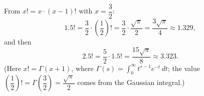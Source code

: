 From $x!=x\cdot(x-1)!$ with $x=\dfrac{3}{2}$:
\[
1.5!=\dfrac{3}{2}\cdot\left(\dfrac{1}{2}\right)!=\dfrac{3}{2}\cdot\dfrac{\sqrt\pi}{2}=\boxed{\dfrac{3\sqrt\pi}{4}}\approx1.329,
\]
and then
\[
2.5!=\dfrac{5}{2}\cdot1.5!=\boxed{\dfrac{15\sqrt\pi}{8}}\approx3.323 .
\]
(Here $x!=\Gamma(x+1)$, where $\Gamma(s)=\displaystyle\int_0^\infty t^{s-1}e^{-t}\,dt$; the value $\left(\dfrac{1}{2}\right)!=\Gamma\left(\dfrac{3}{2}\right)=\dfrac{\sqrt\pi}{2}$ comes from the Gaussian integral.)
